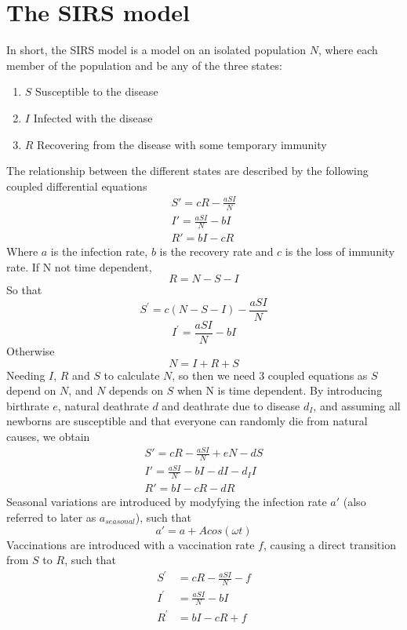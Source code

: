 \section{The SIRS model}
In short, the SIRS model is a model on an isolated population $N$, where each member of the population and be any of the three states:
\begin{enumerate}
    \item $S$ Susceptible to the disease
    \item $I$ Infected with the disease
    \item $R$ Recovering from the disease with some temporary immunity
\end{enumerate}
The relationship between the different states are described by the following coupled differential equations
\begin{eqnarray}
    S' =c R-\frac{a S I}{N} \\
    I' =\frac{a S I}{N}-b I \\
    R' =b I-c R
\end{eqnarray}
Where $a$ is the infection rate, $b$ is the recovery rate and $c$ is the loss of immunity rate.
If N not time dependent,
$$
R = N - S - I
$$
So that
$$
S^{\prime} =c(N-S-I)-\frac{a S I}{N}
$$
$$
I^{\prime} =\frac{a S I}{N}-b I
$$
Otherwise
$$
N = I + R + S
$$
Needing $I$, $R$ and $S$ to calculate $N$, so then we need 3 coupled equations as $S$ depend on $N$, and $N$ depends on $S$ when N is time dependent.
By introducing birthrate $e$, natural deathrate $d$ and deathrate due to disease $d_I$, and assuming all newborns are susceptible and that everyone can randomly die from natural causes, we obtain
\begin{eqnarray}
    S' =c R-\frac{a S I}{N} + eN -dS\\
    I' =\frac{a S I}{N}-b I -dI -d_I I\\
    R' =b I-c R -d R
\end{eqnarray}
Seasonal variations are introduced by modyfying the infection rate $a'$ (also referred to later as $a_{seasonal}$), such that
\begin{equation}
    a'=a+Acos(\omega t)
\end{equation}
Vaccinations are introduced with a vaccination rate $f$, causing a direct transition from $S$ to $R$, such that 
\begin{eqnarray}
    S^{\prime} &=c R-\frac{a S I}{N}-f \\
    I^{\prime} &=\frac{a S I}{N}-b I \\
    R^{\prime} &=b I-c R+f
\end{eqnarray}



